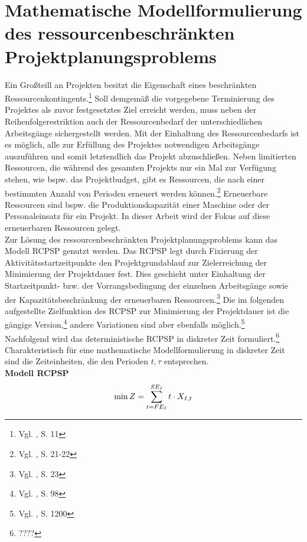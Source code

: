 \documentclass[a4paper,12pt,parskip,bibtotoc,liststotoc]{article}
\begin{document}
\section{Mathematische Modellformulierung des ressourcenbeschränkten Projektplanungsproblems} \label{Grund}
Ein Großteill an Projekten besitzt die Eigenschaft eines beschränkten Ressourcenkontingents.\footnote{Vgl. \cite{kellenbrink2014einfuhrung}, S. 11} Soll demgemäß die vorgegebene Terminierung des Projektes als zuvor festgesetztes Ziel erreicht werden, muss neben der Reihenfolgerestriktion auch der Ressourcenbedarf der unterschiedlichen Arbeitsgänge sichergestellt werden. Mit der Einhaltung des Ressourcenbedarfs ist es möglich, alle zur Erfüllung des Projektes notwendigen Arbeitsgänge auszuführen und somit letztendlich das Projekt abzuschließen. Neben limitierten Ressourcen, die während des gesamten Projekts nur ein Mal zur Verfügung stehen, wie bspw. das Projektbudget, gibt es Ressourcen, die nach einer bestimmten Anzahl von Perioden erneuert werden können.\footnote{Vgl. \cite{neumann2003project}, S. 21-22} Erneuerbare Ressourcen sind bspw. die Produktionskapazität einer Maschine oder der Personaleinsatz für ein Projekt. In dieser Arbeit wird der Fokus auf diese erneuerbaren Ressourcen gelegt.\\

Zur Lösung des ressourcenbeschränkten Projektplanungsproblems kann das Modell RCPSP genutzt werden. Das RCPSP legt durch Fixierung der Aktivitätsstartzeitpunkte den Projektgrundablauf zur Zielerreichung der Minimierung der Projektdauer fest. Dies geschieht unter Einhaltung der Startzeitpunkt- bzw. der Vorrangsbedingung der einzelnen Arbeitsgänge sowie der Kapazitätsbeschränkung der erneuerbaren Ressourcen.\footnote{Vgl. \cite{demeulemeester2011robust}, S. 23} Die im folgenden aufgestellte Zielfunktion des RCPSP zur Minimierung der Projektdauer ist die gängige Version,\footnote{Vgl. \cite{drexl1997neuere}, S. 98} andere Variationen sind aber ebenfalls möglich.\footnote{Vgl. \cite{talbot1982resource}, S. 1200}\\

Nachfolgend wird das deterministische RCPSP in diskreter Zeit formuliert.\footnote{????} Charakteristisch für eine mathematische Modellformulierung in diskreter Zeit sind die Zeiteinheiten, die den Perioden $t, \tau$ entsprechen.\\

\textbf{Modell RCPSP}
\begin{eqnarray} \label{Ziel}
\min Z = \sum_{t=FE_{I}}^{SE_{I}}t \cdot X_{I,t}\hfill  
\end{eqnarray}
\end{document}
